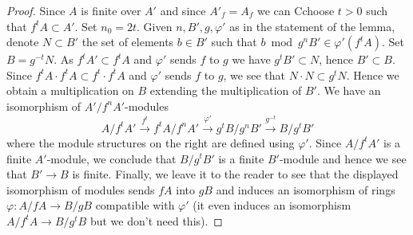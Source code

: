 \documentclass[10pt,a4paper]{amsart}
\theoremstyle{plain}
\theoremstyle{definition}
\theoremstyle{remark}
\numberwithin{equation}{subsection}
\begin{document}
\begin{proof}
Since $A$ is finite over $A'$ and since $A'_f = A_f$ we can
Cchoose $t > 0$ such that $f^t A \subset A'$. Set $n_0 = 2t$.
Given $n, B', g, \varphi'$ as in the statement of the lemma,
denote $N \subset B'$ the set of elements
$b \in B'$ such that $b \bmod g^nB' \in \varphi'(f^tA)$.
Set $B = g^{-t}N$. As $f^tA' \subset f^tA$ and $\varphi'$ sends $f$
to $g$ we have $g^tB' \subset N$, hence $B' \subset B$. Since
$f^tA \cdot f^tA \subset f^t \cdot f^tA$ and $\varphi'$ sends
$f$ to $g$, we see that $N \cdot N \subset g^t N$.
Hence we obtain a multiplication on $B$ extending the
multiplication of $B'$. We have an isomorphism of $A'/f^nA'$-modules
$$
A/f^tA' \xrightarrow{f^t} f^tA/f^nA' \xrightarrow{\varphi'}
g^tB/g^nB' \xrightarrow{g^{-t}} B/g^tB'
$$
where the module structures on the right are defined using $\varphi'$.
Since $A/f^tA'$ is a finite $A'$-module, we conclude that $B/g^tB'$
is a finite $B'$-module and hence we see that $B' \to B$ is finite.
Finally, we leave it to the reader to see that the displayed isomorphism
of modules sends $fA$ into $gB$ and induces an isomorphism of rings
$\varphi : A/fA \to B/gB$ compatible with $\varphi'$ (it even induces an
isomorphism $A/f^tA \to B/g^tB$ but we don't need this).
\end{proof}
\end{document}
